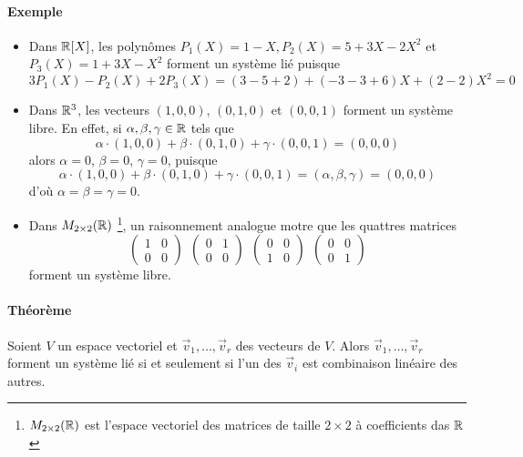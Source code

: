 \paragraph{Exemple}\begin{itemize}
	\item Dans $\mathbb{R}[X]$, les polynômes $P_1(X) = 1 - X, P_2(X) = 5 + 3 X - 2 X^2$ et $ P_3(X) = 1 + 3 X - X^2$ forment un système lié puisque 
	  $$3 P_1(X) - P_2(X) + 2 P_3(X) = (3 - 5 + 2) + (-3 - 3 + 6) X + (2 - 2) X^2 =0$$
	  
	\item Dans $\mathbb{R}^3$, les vecteurs $(1,0,0)$, $(0,1,0)$ et $(0,0,1)$ forment un système libre. En effet, si $\alpha, \beta, \gamma \in \mathbb{R}$ tels que 
	  $$\alpha \cdot (1,0,0)+ \beta \cdot (0,1,0)+ \gamma \cdot (0,0,1) = (0,0,0)$$ 
	  alors $\alpha = 0$, $\beta = 0$, $\gamma = 0$, puisque 
	  $$\alpha \cdot (1,0,0)+ \beta \cdot (0,1,0) + \gamma \cdot (0,0,1)
	    =(\alpha,\beta,\gamma)
	    =(0,0,0)$$ 
	  d'où $\alpha = \beta = \gamma = 0$.
	  
	\item Dans $M_{2 \times 2}(\mathbb{R})$ \footnote{$M_{2 \times 2}(\mathbb{R})$ est l'espace vectoriel des matrices de taille $2 \times 2$ à coefficients das $\mathbb{R}$}, un raisonnement analogue motre que les quattres matrices 
	  $$\begin{pmatrix} 1 & 0 \\ 0 & 0 \end{pmatrix} ~ ~ 
	    \begin{pmatrix} 0 & 1 \\ 0 & 0 \end{pmatrix} ~ ~
	    \begin{pmatrix} 0 & 0 \\ 1 & 0 \end{pmatrix} ~ ~
	    \begin{pmatrix} 0 & 0 \\ 0 & 1 \end{pmatrix}$$ 
	  forment un système libre.
\end{itemize}

\paragraph{Théorème} Soient $V$ un espace vectoriel et $\vec{v}_1, \ldots, \vec{v}_r$ des vecteurs de $V$. Alors $\vec{v}_1, \ldots, \vec{v}_r$ forment un système lié si et seulement si l'un des $\vec{v}_i$ est combinaison linéaire des autres.

